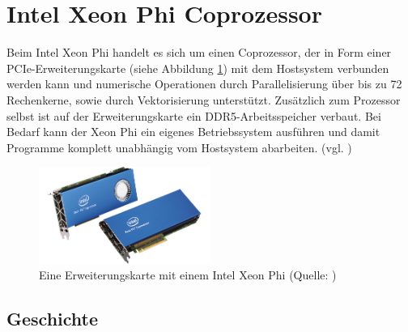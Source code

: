 \documentclass[../main.tex]{subfiles}
\begin{document}
\section{Intel Xeon Phi Coprozessor}
Beim Intel Xeon Phi handelt es sich um einen Coprozessor, der in Form einer PCIe-Erweiterungskarte (siehe Abbildung \ref{pic:xeonphicard}) mit dem Hostsystem verbunden werden kann und numerische Operationen durch Parallelisierung über bis zu 72 Rechenkerne, sowie durch Vektorisierung unterstützt. Zusätzlich zum Prozessor selbst ist auf der Erweiterungskarte ein DDR5-Arbeitsspeicher verbaut. Bei Bedarf kann der Xeon Phi ein eigenes Betriebssystem ausführen und damit Programme komplett unabhängig vom Hostsystem abarbeiten. (vgl. \cite{intelxeonphiprocessors})
\begin{figure}
    \centering 
       \includegraphics[width=0.5\textwidth]{../images/Schmidt/xeon_phi_cards.png} 
    \caption {Eine Erweiterungskarte mit einem Intel Xeon Phi (Quelle: \parencite{intelMICarchitecture})} 
    \label{pic:xeonphicard} 
\end{figure} 

\subsection{Geschichte}
\end{document}
